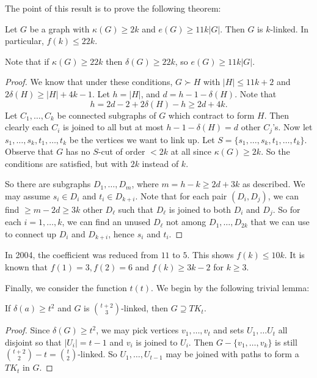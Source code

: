 \documentclass[a4paper]{article}
\begin{document}
The point of this result is to prove the following theorem:
\begin{thm}
  Let $G$ be a graph with $\kappa(G) \geq 2k$ and $e(G) \geq 11k |G|$. Then $G$ is $k$-linked. In particular, $f(k) \leq 22k$.
\end{thm}
Note that if $\kappa(G) \geq 22k$ then $\delta(G) \geq 22k$, so $e(G) \geq 11k |G|$.

\begin{proof}
  We know that under these conditions, $G \succ H$ with $|H| \leq 11k + 2$ and $2\delta(H) \geq |H| + 4k - 1$. Let $h = |H|$, and $d = h - 1 - \delta (H)$. Note that
  \[
    h = 2d - 2 + 2 \delta(H) - h \geq 2d + 4k.
  \]
  Let $C_1, \ldots, C_k$ be connected subgraphs of $G$ which contract to form $H$. Then clearly each $C_i$ is joined to all but at most $h - 1 - \delta(H) = d$ other $C_j$'s. Now let $s_1, \ldots, s_k, t_1, \ldots, t_k$ be the vertices we want to link up. Let $S = \{s_1, \ldots, s_k, t_1, \ldots, t_k\}$. Observe that $G$ has no $S$-cut of order $< 2k$ at all since $\kappa(G) \geq 2k$. So the conditions are satisfied, but with $2k$ instead of $k$.

  So there are subgraphs $D_1, \ldots, D_m$, where $m = h - k \geq 2d + 3k$ as described. We may assume $s_i \in D_i$ and $t_i \in D_{k + i}$. Note that for each pair $(D_i, D_j)$, we can find $\geq m - 2d \geq 3k$ other $D_\ell$ such that $D_\ell$ is joined to both $D_i$ and $D_j$. So for each $i = 1, \ldots, k$, we can find an unused $D_\ell$ not among $D_1, \ldots, D_{2k}$ that we can use to connect up $D_i$ and $D_{k + i}$, hence $s_i$ and $t_i$.
\end{proof}

In 2004, the coefficient was reduced from $11$ to $5$. This shows $f(k) \leq 10 k$. It is known that $f(1) = 3, f(2) = 6$ and $f(k) \geq 3k - 2$ for $k \geq 3$.

Finally, we consider the function $t(t)$. We begin by the following trivial lemma:
\begin{lemma}
  If $\delta(a) \geq t^2$ and $G$ is $\binom{t + 2}{3}$-linked, then $G \supseteq TK_t$.
\end{lemma}

\begin{proof}
  Since $\delta(G) \geq t^2$, we may pick vertices $v_1, \ldots, v_t$ and sets $U_1, \ldots U_t$ all disjoint so that $|U_i| = t - 1$ and $v_i$ is joined to $U_i$. Then $G - \{v_1, \ldots, v_k\}$ is still $\binom{t + 2}{2} - t = \binom{t}{2}$-linked. So $U_1, \ldots, U_{t - 1}$ may be joined with paths to form a $TK_t$ in $G$.
\end{proof}
\end{document}
